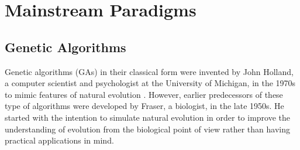 


	\section{Mainstream Paradigms}
	\label{evoalg:s:mainstreamParadigms}

	\subsection{Genetic Algorithms}
	\label{evoalg:subs:geneticAlgorithms}

Genetic algorithms (GAs) in their classical form were invented
by John Holland, a computer scientist and psychologist at the
University of Michigan, in the 1970s to mimic features of natural
evolution \cite{Holland:75}.  However,  earlier predecessors of
these type of algorithms were developed by Fraser, a biologist, in the
late 1950s. He started with the intention to simulate natural
evolution in order to improve the understanding of evolution from the
biological point of view rather than having practical applications in
mind.

